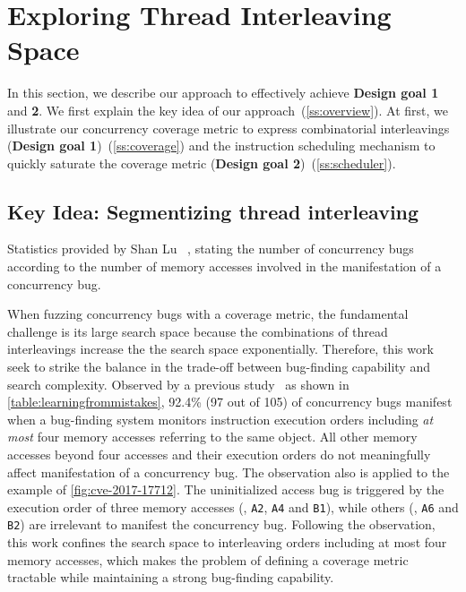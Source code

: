 \section{Exploring Thread Interleaving Space}
\label{s:design}

In this section, we describe our approach to effectively achieve
\textbf{Design goal 1} and \textbf{2}.
%
We first explain the key idea of our approach~(\autoref{ss:overview}). 
At first, we illustrate our concurrency
coverage metric to express combinatorial interleavings 
(\textbf{Design goal 1})~(\autoref{ss:coverage}) and the instruction scheduling mechanism
to quickly saturate the coverage metric (\textbf{Design goal 2})~(\autoref{ss:scheduler}).


\subsection{Key Idea: Segmentizing thread interleaving}
\label{ss:overview}

\begin{table}[t]
  \centering
  
  \caption{Statistics provided by Shan Lu
    \etal~\cite{learningfrommistakes}, stating the number of
    concurrency bugs according to the number of memory accesses
    involved in the manifestation of a concurrency bug.}
  \label{table:learningfrommistakes}
\end{table}

When fuzzing concurrency bugs with a coverage metric, the fundamental challenge is its large search space because
the combinations of thread interleavings increase the 
the search space exponentially. Therefore, this work seek to 
strike the balance
in the trade-off between bug-finding capability and search 
complexity. Observed by a previous study~\cite{learningfrommistakes}
as shown in \autoref{table:learningfrommistakes}, 92.4\% (97 out of
105) of concurrency bugs manifest when a bug-finding system 
monitors instruction execution orders including \textit{at most} 
four memory accesses referring to the same object.
All other memory
accesses beyond four accesses and their execution orders do not
meaningfully affect manifestation of a concurrency bug. 
The observation also is applied to the example of \autoref{fig:cve-2017-17712}. The uninitialized access bug is triggered by 
the execution order of three
memory accesses (\eg, \texttt{A2}, \texttt{A4} and \texttt{B1}), while
others (\eg, \texttt{A6} and \texttt{B2}) are irrelevant to manifest the
concurrency bug.
Following the observation, this work confines the search space 
to interleaving orders including at most four memory accesses,
which makes the problem of defining a coverage metric tractable while maintaining a strong bug-finding capability.

